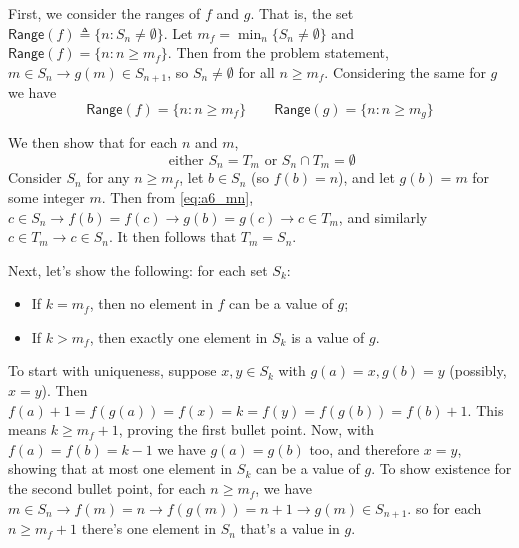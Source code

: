 \documentclass[11pt]{article}
\newcommand{\<}{\langle}
\renewcommand{\>}{\rangle}
\begin{document}
\begin{enumerate}
    First, we consider the ranges of $f$ and $g$. 
    That is, the set $\mathsf{Range}(f)\triangleq \{n: S_n\neq\emptyset\}$. 
    Let $m_f = \min_n\{S_n\neq \emptyset\}$ and $\mathsf{Range}(f) = \{n: n\ge m_f\}$. 
    Then from the problem statement, $m\in S_n\to g(m)\in S_{n+1}$, 
    so $S_n\neq\emptyset$ for all $n\ge m_f$. 
    Considering the same for $g$ we have 
    \begin{equation}
    	\mathsf{Range}(f) = \{n: n\ge m_f\}\qquad \mathsf{Range}(g) = \{n: n\ge m_g\}
    \end{equation}
    
    We then show that for each $n$ and $m$, 
    \begin{equation}
    	\text{ either } S_n = T_m \text{ or } S_n\cap T_m = \emptyset
    \end{equation}
    Consider $S_n$ for any $n\ge m_f$, let $b\in S_n$ 
    (so $f(b)=n$), and let $g(b)=m$ for some integer $m$. 
    Then from \ref{eq:a6_mn}, 
    $c\in S_n\to f(b)=f(c)\to g(b)=g(c)\to c\in T_m$, 
    and similarly $c\in T_m\to c\in S_n$. 
    It then follows that $T_m = S_n$. 
    
    Next, let's show the following: for each set $S_k$: 
    \begin{itemize}
    	\item If $k = m_f$, then no element in $f$ can be a value of $g$; 
    	\item If $k > m_f$, then exactly one element in $S_k$ is a value of $g$. 
    \end{itemize}
    To start with uniqueness, suppose $x, y\in S_k$ with $g(a)=x, g(b)=y$ (possibly, $x=y$). 
    Then $f(a)+1=f(g(a))=f(x)=k=f(y)=f(g(b))=f(b)+1$. 
    This means $k\ge m_f + 1$, proving the first bullet point. 
    Now, with $f(a)=f(b)=k-1$ we have $g(a)=g(b)$ too, 
    and therefore $x=y$, showing that at most one element in $S_k$ can be a value of $g$. 
    To show existence for the second bullet point, 
    for each $n\ge m_f$, we have $m\in S_n\to f(m)=n\to f(g(m)) = n + 1\to g(m)\in S_{n+1}$. 
    so for each $n\ge m_f + 1$ there's one element in $S_n$ that's a value in $g$. 
    

\end{enumerate}
\end{document}
